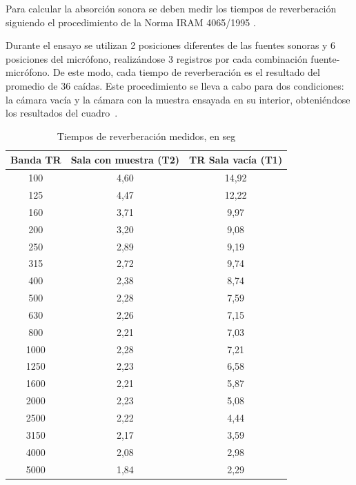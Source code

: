 \par Para calcular la absorción sonora se deben medir los tiempos de reverberación siguiendo el procedimiento de la Norma IRAM 4065/1995 .

Durante el ensayo se utilizan 2 posiciones diferentes de las fuentes sonoras y 6 posiciones del micrófono, realizándose 3 registros por cada combinación fuente-micrófono. De este modo, cada tiempo de reverberación es el resultado del promedio de 36 caídas. Este procedimiento se lleva a cabo para dos condiciones: la cámara vacía y la cámara con la muestra ensayada en su interior, obteniéndose los resultados del cuadro~.


\begin{table}[H]
\setlength\arrayrulewidth{1pt}
    \centering
    \begin{tabular}{|c|c|c|} \hline
        \textbf{Banda TR} & \textbf{Sala con muestra (T2)}& \textbf{TR Sala vacía (T1)} \\ \hline \hline
        100&	4,60&	14,92\\ \hline
        125&	4,47&	12,22 \\ \hline
        160&	3,71&	9,97 \\ \hline
        200&	3,20&	9,08 \\ \hline
        250&	2,89&	9,19 \\ \hline
        315&	2,72&	9,74 \\ \hline
        400&	2,38&	8,74 \\ \hline
        500&	2,28&	7,59 \\ \hline
        630&	2,26&	7,15\\ \hline
        800&	2,21&	7,03 \\ \hline
        1000&	2,28&	7,21 \\ \hline
        1250&	2,23&	6,58 \\ \hline
        1600&	2,21&	5,87 \\ \hline
        2000&	2,23&	5,08 \\ \hline
        2500&	2,22&	4,44 \\ \hline
        3150&	2,17&	3,59 \\ \hline
        4000&	2,08&	2,98 \\ \hline
        5000&	1,84&	2,29 \\ \hline
    \end{tabular}
    \caption{Tiempos de reverberación medidos, en seg}
    \label{tab:Tiempos_reverberacion}
\end{table}

